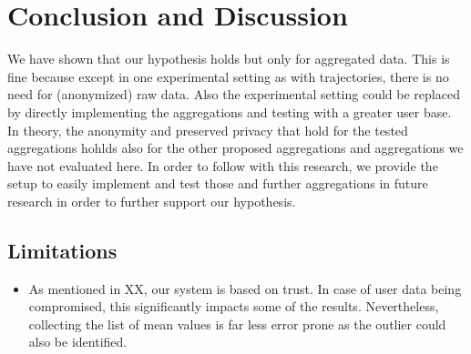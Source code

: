 \chapter{Conclusion and Discussion}\label{chapter:conclusion}
We have shown that our hypothesis holds but only for aggregated data. This is fine because except in one experimental setting as with trajectories, there is no need for (anonymized) raw data. Also the experimental setting could be replaced by directly implementing the aggregations and testing with a greater user base. In theory, the anonymity and preserved privacy that hold for the tested aggregations hohlds also for the other proposed aggregations and aggregations we have not evaluated here. In order to follow with this research, we provide the setup to easily implement and test those and further aggregations in future research in order to further support our hypothesis.

\section{Limitations}
\begin{itemize}
	\item As mentioned in XX, our system is based on trust. In case of user data being compromised, this significantly impacts some of the results. Nevertheless, collecting the list of mean values is far less error prone as the outlier could also be identified.
\end{itemize}

